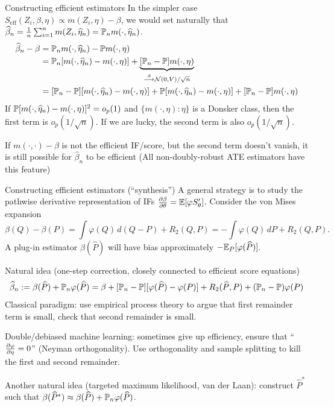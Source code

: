 \documentclass[10pt,aspectratio=169,handout]{beamer}
\theoremstyle{definition}
\begin{document}
\begin{frame}{Constructing efficient estimators}
In the simpler case $S_\text{eff}(Z_i, \beta,\eta) \propto m(Z_i, \eta) -
\beta$,
we would set naturally that $\hat\beta_n = \frac{1}{n}\sum_{i=1}^n m(Z_i,
\hat\eta_n) = \P_n m(\cdot, \hat \eta_n)$.
\begin{align*}
\hat\beta_n - \beta &= \P_n m(\cdot, \hat\eta_n) - \P m(\cdot, \eta) \\ 
&= \P_n[m(\cdot, \hat\eta_n) - m(\cdot, \eta)] + \underbrace{[\P_n - \P]m
(\cdot, \eta)}_{\dto \Norm(0, V) / \sqrt{n}} \\ 
&= [\P_n - \P][m(\cdot, \hat\eta_n) - m(\cdot, \eta)] + \P[m(\cdot,
\hat\eta_n) - m(\cdot, \eta)] + [\P_n - \P]m
(\cdot, \eta)
\end{align*}
If $\P[m(\cdot,\hat \eta_n) - m(\cdot,\eta)]^2 = o_p(1)$ and $\{m(\cdot,
\eta) : \eta\}$ is a Donsker class, then the first term is $o_p(1/
\sqrt{n})$. If we are lucky, the second term is also $o_p(1/\sqrt{n})$. 

If $m
(\cdot,\cdot)-\beta$ is
not the efficient IF/score, but the second term  doesn't vanish, it is
still
possible for $\hat\beta_n$ to be efficient (All non-doubly-robust ATE
estimators have this feature)
  
\end{frame}

\begin{frame}{Constructing efficient estimators (``synthesis'')}
\small
  A general strategy is to study the \alert{pathwise derivative}
  representation of
  IFs $\diff{\beta}{\theta} = \E[\varphi S_\theta']$. Consider the 
  \alert{von Mises expansion} \[
  \beta(Q) - \beta(P) = \int \varphi(Q) \,d(Q-P) + R_2(Q,P) = -\int \varphi
  (Q)\,dP + R_2(Q,P). 
  \]
  A plug-in estimator $\beta(\hat P)$ will have bias approximately $-\E_P
  [\varphi(\hat P)]$. 
  
  Natural idea (\alert{one-step correction}, closely
  connected to efficient score equations)
  \[
  \hat \beta_n := \beta(\hat P) + \P_n \varphi(\hat P) = \beta + [\P_n -
  \P][\varphi(\hat P) - \varphi(P)] + R_2(\hat P, P) + (\P_n - \P)\varphi
  (P)
  \]
  Classical paradigm: use empirical process theory to argue that first
  remainder term is small, check that second remainder is small.
  
  \alert{Double/debiased machine learning}: sometimes give up efficiency,
  ensure that ``$\diff{\varphi}{\eta} = 0$'' (Neyman orthogonality). Use
  orthogonality and sample splitting to kill the first and second
  remainder. 
  
  Another natural idea (\alert{targeted maximum likelihood}, van der Laan):
  construct $\hat P^*$ such that $\beta(\hat P^*) \approx \beta(\hat P) +
  \P_n \varphi(\hat P)$.
  
  

  \end{frame}
\hypertarget{sec:applied}{} 
\end{document}
